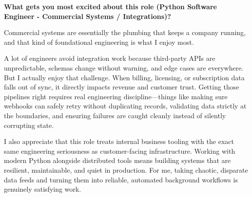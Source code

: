 \documentclass[letterpaper,11pt]{article}
\newcommand{\interviewQuestion}[1]{%
  \vspace{8pt}%
  \textbf{\color{airforceblue}#1}\par%
}
\begin{document}
\interviewQuestion{What gets you most excited about this role (Python Software Engineer - Commercial Systems / Integrations)?}


Commercial systems are essentially the plumbing that keeps a company running, and that kind of foundational engineering is what I enjoy most.

A lot of engineers avoid integration work because third-party APIs are unpredictable, schemas change without warning, and edge cases are everywhere. But I actually enjoy that challenge. When billing, licensing, or subscription data falls out of sync, it directly impacts revenue and customer trust. Getting those pipelines right requires real engineering discipline—things like making sure webhooks can safely retry without duplicating records, validating data strictly at the boundaries, and ensuring failures are caught cleanly instead of silently corrupting state.

I also appreciate that this role treats internal business tooling with the exact same engineering seriousness as customer-facing infrastructure. Working with modern Python alongside distributed tools means building systems that are resilient, maintainable, and quiet in production. For me, taking chaotic, disparate data feeds and turning them into reliable, automated background workflows is genuinely satisfying work.
\end{document}
